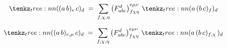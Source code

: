 \documentclass[varwidth=19cm, border=6pt]{standalone}
\begin{document}
\[
  \tntree{((a\,b)_e\,c)_d}
  \;=\;
  \sum_{f,\chi,\eta}
  \left(F_{abc}^{d}\right)_{f\chi\eta}^{e\mu\nu}\,
  \tntree{(a\,(b\,c)_f)_d}
\]

\[
  \tntree{((a\,b)_{e,\mu}\,c)_d}
  \;=\;
  \sum_{f,\chi,\eta}
  \left(F_{abc}^{d}\right)_{f\chi\eta}^{e\mu\nu}\,
  \tntree{(a\,(b\,c)_{f,\chi}\,)_d}
\]
\end{document}
